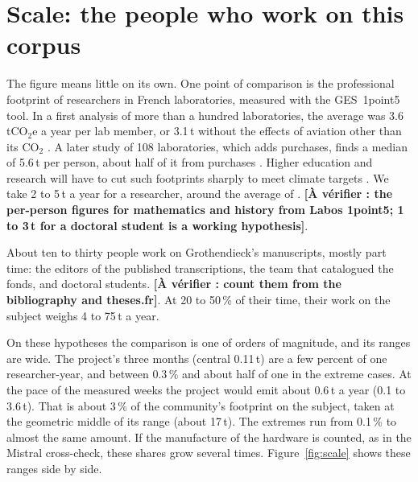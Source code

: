 \documentclass[11pt,a4paper]{article}
\newcommand{\todo}[1]{\textbf{[À vérifier : #1]}}
\begin{document}
\section{Scale: the people who work on this corpus}

The figure means little on its own. One point of comparison is the professional footprint of researchers in French laboratories, measured with the GES~1point5 tool. In a first analysis of more than a hundred laboratories, the average was 3.6\,tCO$_2$e a year per lab member, or 3.1\,t without the effects of aviation other than its CO$_2$ \citep{mariette2022}. A later study of 108 laboratories, which adds purchases, finds a median of 5.6\,t per person, about half of it from purchases \citep{depaepe2024}. Higher education and research will have to cut such footprints sharply to meet climate targets \citep{ligozat2024targets}. We take 2 to 5\,t a year for a researcher, around the average of \citet{mariette2022}. \todo{the per-person figures for mathematics and history from Labos 1point5; 1 to 3\,t for a doctoral student is a working hypothesis}.

About ten to thirty people work on Grothendieck's manuscripts, mostly part time: the editors of the published transcriptions, the team that catalogued the fonds, and doctoral students. \todo{count them from the bibliography and theses.fr}. At 20 to 50\,\% of their time, their work on the subject weighs 4 to 75\,t a year.

On these hypotheses the comparison is one of orders of magnitude, and its ranges are wide. The project's three months (central 0.11\,t) are a few percent of one researcher-year, and between 0.3\,\% and about half of one in the extreme cases. At the pace of the measured weeks the project would emit about 0.6\,t a year (0.1 to 3.6\,t). That is about 3\,\% of the community's footprint on the subject, taken at the geometric middle of its range (about 17\,t). The extremes run from 0.1\,\% to almost the same amount. If the manufacture of the hardware is counted, as in the Mistral cross-check, these shares grow several times. Figure~\ref{fig:scale} shows these ranges side by side.
\end{document}
